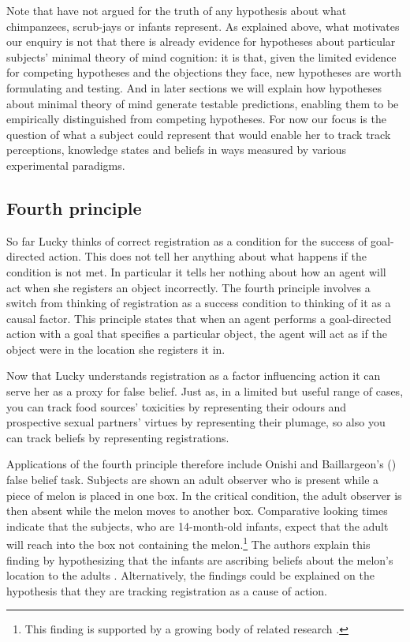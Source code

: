 \documentclass[12pt,\papersize]{extarticle}
\begin{document}
Note that have not argued for the truth of any hypothesis about what chimpanzees, scrub-jays or infants represent.
As explained above, what motivates our enquiry is not that there is already evidence for hypotheses about particular subjects' minimal theory of mind cognition: it is that, given the limited evidence for competing hypotheses and the objections they face, new hypotheses are worth formulating and testing.
And in later sections we will explain how hypotheses about minimal theory of mind generate testable predictions, enabling them to be empirically distinguished from competing hypotheses.
For now our focus is the question of what a subject could represent that would enable her to track track perceptions, knowledge states and beliefs in ways measured by various experimental paradigms.




\subsection{Fourth principle}

So far Lucky thinks of correct registration as a condition for the success of goal-directed action.  This does not tell her anything about what happens if the condition is not met.  In particular it tells her nothing about how an agent will act when she registers an object incorrectly.  The fourth principle involves a switch from thinking of registration as a success condition to thinking of it as a causal factor.  This principle states that when an agent performs a goal-directed action with a goal that specifies a particular object, the agent will act as if the object were in the location she registers it in.

Now that Lucky understands registration as a factor influencing action it can serve her as a proxy for false belief.  Just as, in a limited but useful range of cases, you can track food sources' toxicities by representing their odours
and prospective sexual partners’ virtues by representing their plumage, so also you can track beliefs by representing registrations.

Applications of the fourth principle therefore include Onishi and Baillargeon’s (\citeyear[]{en_1092}) false belief task.  Subjects are shown an adult observer who is present while a piece of melon is placed in one box.  In the critical condition, the adult observer is then absent while the melon moves to another box.  Comparative looking times indicate that the subjects, who are 14-month-old infants, expect that the adult will reach into the box not containing the melon.\footnote{ 	This finding is supported by a growing body of related research \citep[including][]{en_1666, en_1690, en_1691, en_1208, en_1261}.}  The authors explain this finding by hypothesizing that the infants are ascribing beliefs about the melon’s location to the adults \citep[][p.\ 257]{en_1092}.  Alternatively, the findings could be explained on the hypothesis that they are tracking registration as a cause of action.
\end{document}
